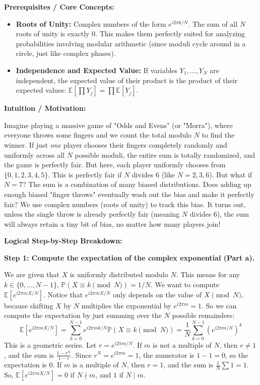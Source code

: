 \begin{solution}
\textbf{Prerequisites / Core Concepts:}
\begin{itemize}
    \item \textbf{Roots of Unity:} Complex numbers of the form $e^{i 2\pi k / N}$. The sum of all $N$ roots of unity is exactly 0. This makes them perfectly suited for analyzing probabilities involving modular arithmetic (since moduli cycle around in a circle, just like complex phases).
    \item \textbf{Independence and Expected Value:} If variables $Y_1, \dots, Y_N$ are independent, the expected value of their product is the product of their expected values: $\mathbb{E}[\prod Y_j] = \prod \mathbb{E}[Y_j]$.
\end{itemize}

\textbf{Intuition / Motivation:}

Imagine playing a massive game of "Odds and Evens" (or "Morra"), where everyone throws some fingers and we count the total modulo $N$ to find the winner. If just \textit{one} player chooses their fingers completely randomly and uniformly across all $N$ possible moduli, the entire sum is totally randomized, and the game is perfectly fair. 
But here, each player uniformly chooses from $\{0,1,2,3,4,5\}$. This is perfectly fair if $N$ divides 6 (like $N=2, 3, 6$). But what if $N=7$? The sum is a combination of many biased distributions. Does adding up enough biased "finger throws" eventually wash out the bias and make it perfectly fair? We use complex numbers (roots of unity) to track this bias. It turns out, unless the single throw is already perfectly fair (meaning $N$ divides 6), the sum will always retain a tiny bit of bias, no matter how many players join!

\textbf{Logical Step-by-Step Breakdown:}

\textbf{Step 1: Compute the expectation of the complex exponential (Part a).}

We are given that $X$ is uniformly distributed modulo $N$. This means for any $k \in \{0, \dots, N-1\}$, $\mathbb{P}(X \equiv k \pmod{N}) = 1/N$.
We want to compute $\mathbb{E}[e^{i 2\pi m X / N}]$.
Notice that $e^{i 2\pi m X / N}$ only depends on the value of $X \pmod{N}$, because shifting $X$ by $N$ multiplies the exponential by $e^{i 2\pi m} = 1$.
So we can compute the expectation by just summing over the $N$ possible remainders:
\[ \mathbb{E}[e^{i 2\pi m X / N}] = \sum_{k=0}^{N-1} e^{i 2\pi m k / N} \mathbb{P}(X \equiv k \pmod{N}) = \frac{1}{N} \sum_{k=0}^{N-1} \left( e^{i 2\pi m / N} \right)^k \]
This is a geometric series. Let $r = e^{i 2\pi m / N}$.
If $m$ is not a multiple of $N$, then $r \neq 1$, and the sum is $\frac{1-r^N}{1-r}$. Since $r^N = e^{i 2\pi m} = 1$, the numerator is $1-1=0$, so the expectation is 0.
If $m$ is a multiple of $N$, then $r = 1$, and the sum is $\frac{1}{N} \sum 1 = 1$.
So, $\mathbb{E}[e^{i 2\pi m X / N}] = 0$ if $N \nmid m$, and $1$ if $N \mid m$.


\end{solution}
